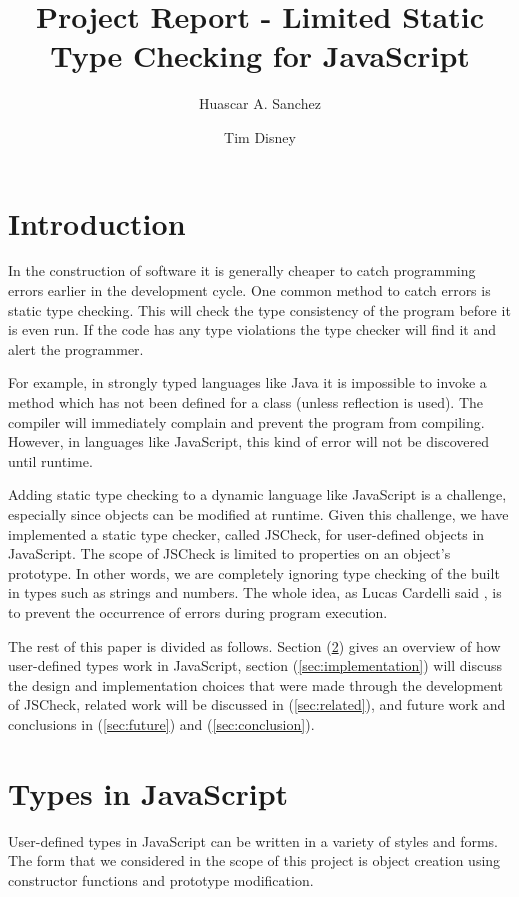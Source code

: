 \documentclass{article}
\begin{document}
\title{Project Report - Limited Static Type Checking for JavaScript}
\author{Huascar A. Sanchez \and Tim Disney}

\maketitle

\lstset{showstringspaces=false}

\section{Introduction}
In the construction of software it is generally cheaper to 
catch programming errors earlier in the development cycle. One common method 
to catch errors is static type checking. This will
check the type consistency of the program before it is even
run. If the code has any type violations the type checker will 
find it and alert the programmer.

For example, in strongly typed languages like Java it is impossible 
to invoke a method which has not been defined for a class (unless reflection is used).
The compiler will immediately 
complain and prevent the program from compiling. However, in languages like 
JavaScript, this kind of error will not be discovered until runtime.

Adding static type checking to a dynamic language like JavaScript is a 
challenge, especially since objects can be modified at runtime. Given this challenge, 
we have implemented a static type checker, called JSCheck, for user-defined objects 
in JavaScript. The scope of JSCheck is limited to properties on an object's
prototype. In other words, we are completely ignoring type checking of the built in types
such as strings and numbers. The whole idea, as Lucas Cardelli said \cite{typesystems}, 
is to prevent the occurrence of errors during program execution. 

The rest of this paper is divided as follows. Section (\ref{sec:types}) gives an overview
of how user-defined types work in JavaScript, section (\ref{sec:implementation}) 
will discuss the design and implementation choices that were made through the development 
of JSCheck, related work will be discussed in (\ref{sec:related}), and future work
and conclusions in (\ref{sec:future}) and (\ref{sec:conclusion}).


\section{Types in JavaScript}
\label{sec:types}
User-defined types in JavaScript can be written in a variety of styles and forms. The form
that we considered in the scope of this project is object creation using 
constructor functions and prototype modification.
\end{document}
